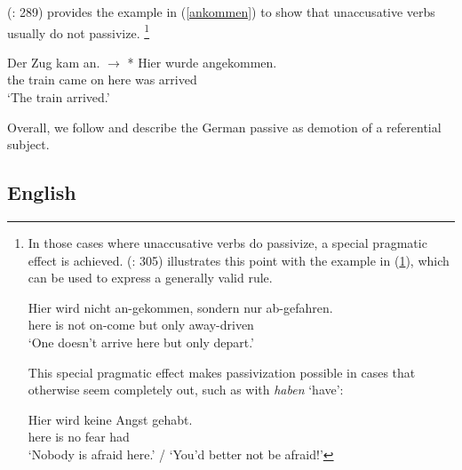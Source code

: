 \documentclass[output=paper]{langsci/langscibook}
\begin{document}
\citeauthor{Mueller:13} (\citeyear{Mueller:13}: 289) provides the example in (\ref{ankommen}) to show that unaccusative verbs usually do not passivize.%
\footnote{\label{fn-unaccusative-passive}In those cases where unaccusative verbs do passivize, a special pragmatic effect is achieved.
\citeauthor{Mueller:13} (\citeyear{Mueller:13}: 305) illustrates this point with the example in (\ref{directive-ankommen}), which can be used to express a gene\-rally valid rule.

\begingroup
{}
\setcounter{saveequation}{\value{equation}}
\setcounter{equation}{0}
\renewcommand{\thexnumi}{\roman{xnumi}}

\ea
\gll Hier wird nicht an-gekommen, sondern nur ab-gefahren.\\
here is not on-come but only away-driven\\
\glt `One doesn't arrive here but only depart.' \label{directive-ankommen}
\z

This special pragmatic effect makes passivization possible in cases that otherwise seem completely out, such as with \textit{haben} `have':

\ea
\gll Hier wird keine Angst gehabt.\\
here is no fear had\\
\glt `Nobody is afraid here.' / `You'd better not be afraid!'
\zlast
\setcounter{equation}{\value{saveequation}}
\endgroup
}

\ea
\gll Der Zug kam an. $\longrightarrow$ * Hier wurde angekommen.\\
the train came on {} {} here was arrived\\
\glt `The train arrived.'
\label{ankommen}
\z

Overall, we follow \cite{Mueller:13} and describe the 
German passive as  demotion of a referential subject.


\subsection{English}
\label{Sec-RestrictionsEnglish}
\end{document}
